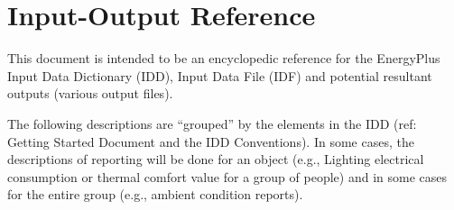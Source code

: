 \chapter{Input-Output Reference}\label{input-output-reference}

This document is intended to be an encyclopedic reference for the EnergyPlus Input Data Dictionary (IDD), Input Data File (IDF) and potential resultant outputs (various output files).

The following descriptions are ``grouped'' by the elements in the IDD (ref: Getting Started Document and the IDD Conventions). In some cases, the descriptions of reporting will be done for an object (e.g., Lighting electrical consumption or thermal comfort value for a group of people) and in some cases for the entire group (e.g., ambient condition reports).







































